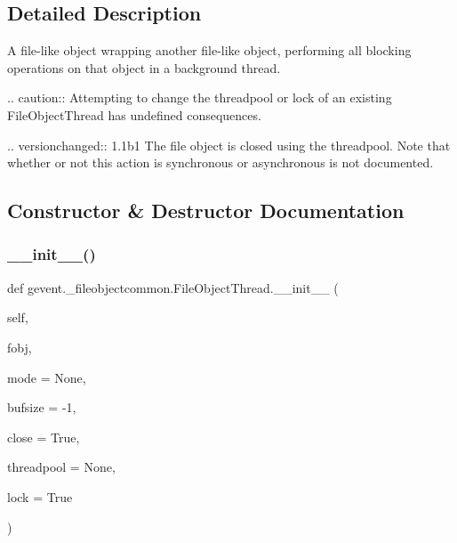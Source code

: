 \subsection{Detailed Description}
\begin{DoxyVerb}A file-like object wrapping another file-like object, performing all blocking
operations on that object in a background thread.

.. caution::
    Attempting to change the threadpool or lock of an existing FileObjectThread
    has undefined consequences.

.. versionchanged:: 1.1b1
   The file object is closed using the threadpool. Note that whether or
   not this action is synchronous or asynchronous is not documented.\end{DoxyVerb}
 

\subsection{Constructor \& Destructor Documentation}
\mbox{\label{classgevent_1_1__fileobjectcommon_1_1_file_object_thread_ae43a8e09d2632ab8af16333ff40bef24}} 
\subsubsection{\texorpdfstring{\+\_\+\+\_\+init\+\_\+\+\_\+()}{\_\_init\_\_()}}
{\footnotesize\ttfamily def gevent.\+\_\+fileobjectcommon.\+File\+Object\+Thread.\+\_\+\+\_\+init\+\_\+\+\_\+ (\begin{DoxyParamCaption}\item[{}]{self,  }\item[{}]{fobj,  }\item[{}]{mode = {\ttfamily None},  }\item[{}]{bufsize = {\ttfamily -\/1},  }\item[{}]{close = {\ttfamily True},  }\item[{}]{threadpool = {\ttfamily None},  }\item[{}]{lock = {\ttfamily True} }\end{DoxyParamCaption})}


